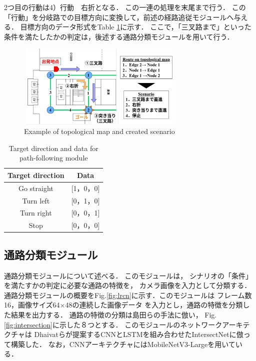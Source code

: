 \documentclass{sice-si}
\begin{document}
2つ目の行動は4）行動　右折となる．
この一連の処理を末尾まで行う．
この「行動」を分岐路での目標方向に変換して，前述の経路追従モジュールへ与える．
目標方向のデータ形式をTable \ref{tab:target}に示す．
ここで，「三叉路まで」といった条件を満たしたかの判定は，後述する通路分類モジュールを用いて行う．
\begin{figure}[htbp]
    \centering
     \includegraphics[height=40mm,width=80mm]{./figs/topo2sce.pdf}
     \caption{Example of topological map and created scenario}\label{fig:topo2sce}
\end{figure}
\begin{table}[]
    \centering
    \caption{Target direction and data for path-following module}\label{tab:target}
    \begin{tabular}{|c|c|}
    \hline
    Target direction & Data        \\
    \hline
    Go straight   & {[}1，0，0{]} \\
    Turn left   & {[}0，1，0{]} \\
    Turn right   & {[}0，0，1{]} \\
    Stop   & {[}0，0，0{]}\\
    \hline
    \end{tabular}
    \end{table}

\subsection{通路分類モジュール}
通路分類モジュールについて述べる．
このモジュールは，
シナリオの「条件」を満たすかの判定に必要な通路の特徴を，
カメラ画像を入力として分類する．
通路分類モジュールの概要をFig.\ref{fig:lrcn}に示す．このモジュールは
フレーム数16，画像サイズ64×48の連続した画像データ
を入力とし，通路の特徴を分類した結果を出力する．
通路の特徴の分類は島田らの手法\cite{shimada2020}に倣い，
Fig.\ref{fig:intersection}に示した８つとする．
このモジュールのネットワークアーキテクチャは
Dhaivatらが提案するCNNとLSTMを組み合わせたIntersectNet\cite{lrcn}に倣って構築した．
なお，CNNアーキテクチャにはMobileNetV3-Large\cite{v3}を用いている．
\end{document}
